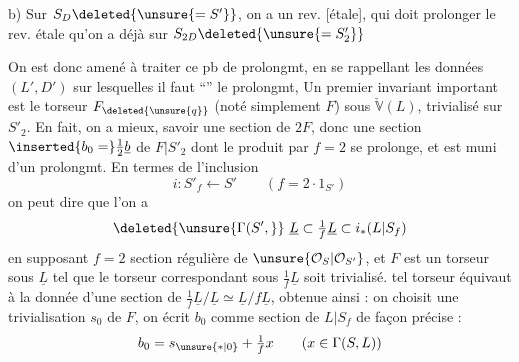 b) Sur $S_D\deleted{\unsure{=S'}}$, on a un rev. [étale], qui doit prolonger le rev. étale qu'on a déjà sur $S_{2D}\deleted{\unsure{=S'_2}}$

On est donc amené  à traiter ce pb de prolongmt, en se rappellant les données $(L',D')$ sur lesquelles il faut ``'' le prolongmt,  Un premier invariant important est le torseur $F_{\deleted{\unsure{q}}}$ (noté simplement $F$) sous $\check{\mathbb V}(L)$, trivialisé sur $S'_2$. En fait, on a mieux, savoir une section  de $2F$, donc une section $\inserted{b_0=}\frac12\underline b$ de $F|S'_2$  dont le produit par $f=2$ se prolonge, et est muni d'un prolongmt. En termes de l'inclusion
\[i:S'_f\longleftarrow S'\qquad(f=2\cdot1_{S'})\]
on peut dire que l'on a
\[\deleted{\unsure{\Gamma(S',}}\ \underline L\subset\tfrac1f\underline L\subset i_*(L|S_f)\]
en supposant $f=2$ section régulière de $\unsure{\mathcal O_S|\mathcal O_{S'}}$, et $F$ est un torseur sous $\underline L$ tel que le torseur correspondant sous $\frac1f\underline L$ soit trivialisé.   tel torseur  équivaut à la donnée d'une section de $\frac1f\underline L/\underline L\simeq\underline L/f\underline L$,  obtenue ainsi : on choisit  une trivialisation  $s_0$ de $F$, on écrit $b_0$ comme section de $L|S_f$ de façon précise :
\[b_0=s_{\unsure{*|0}}+\tfrac1f x\qquad(x\in\Gamma(S,L))\]
